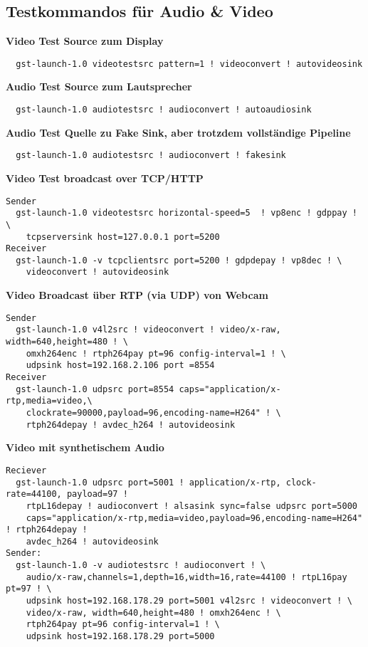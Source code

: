 \subsection{Testkommandos für Audio \& Video}
\textbf{Video Test Source zum Display}
\begin{verbatim}
  gst-launch-1.0 videotestsrc pattern=1 ! videoconvert ! autovideosink
\end{verbatim}

\textbf{Audio Test Source zum Lautsprecher}
\begin{verbatim}
  gst-launch-1.0 audiotestsrc ! audioconvert ! autoaudiosink
\end{verbatim}

\textbf{Audio Test Quelle zu Fake Sink, aber trotzdem vollständige Pipeline}
\begin{verbatim}
  gst-launch-1.0 audiotestsrc ! audioconvert ! fakesink
\end{verbatim}

\textbf{Video Test broadcast over TCP/HTTP}
\begin{verbatim}
Sender
  gst-launch-1.0 videotestsrc horizontal-speed=5  ! vp8enc ! gdppay ! \
    tcpserversink host=127.0.0.1 port=5200
Receiver
  gst-launch-1.0 -v tcpclientsrc port=5200 ! gdpdepay ! vp8dec ! \
    videoconvert ! autovideosink
\end{verbatim}

\textbf{Video Broadcast über RTP (via UDP) von Webcam}
\begin{verbatim}
Sender
  gst-launch-1.0 v4l2src ! videoconvert ! video/x-raw, width=640,height=480 ! \
    omxh264enc ! rtph264pay pt=96 config-interval=1 ! \
    udpsink host=192.168.2.106 port =8554
Receiver
  gst-launch-1.0 udpsrc port=8554 caps="application/x-rtp,media=video,\
    clockrate=90000,payload=96,encoding-name=H264" ! \
    rtph264depay ! avdec_h264 ! autovideosink
\end{verbatim}

\textbf{Video mit synthetischem Audio}
\begin{verbatim}
Reciever
  gst-launch-1.0 udpsrc port=5001 ! application/x-rtp, clock-rate=44100, payload=97 ! 
    rtpL16depay ! audioconvert ! alsasink sync=false udpsrc port=5000 
    caps="application/x-rtp,media=video,payload=96,encoding-name=H264" ! rtph264depay !     
    avdec_h264 ! autovideosink
Sender:
  gst-launch-1.0 -v audiotestsrc ! audioconvert ! \
    audio/x-raw,channels=1,depth=16,width=16,rate=44100 ! rtpL16pay pt=97 ! \
    udpsink host=192.168.178.29 port=5001 v4l2src ! videoconvert ! \
    video/x-raw, width=640,height=480 ! omxh264enc ! \
    rtph264pay pt=96 config-interval=1 ! \
    udpsink host=192.168.178.29 port=5000
\end{verbatim}

